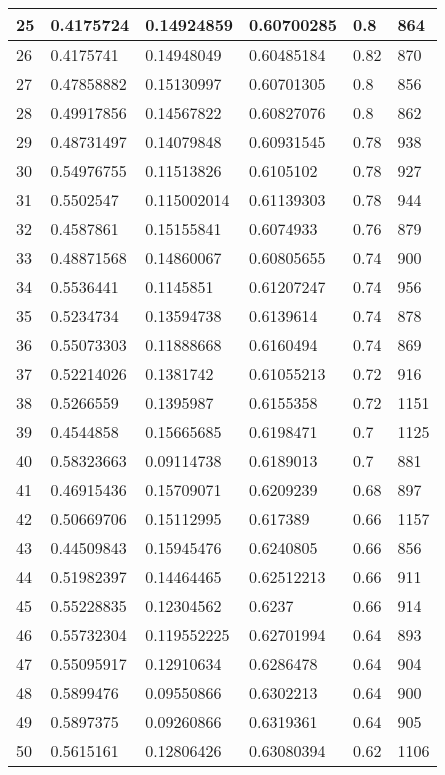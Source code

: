 \begin{longtable}{|l|l|l|l|l|l|}
25 & 0.4175724 & 0.14924859 & 0.60700285 & 0.8 & 864 \\ \hline 
26 & 0.4175741 & 0.14948049 & 0.60485184 & 0.82 & 870 \\ \hline 
27 & 0.47858882 & 0.15130997 & 0.60701305 & 0.8 & 856 \\ \hline 
28 & 0.49917856 & 0.14567822 & 0.60827076 & 0.8 & 862 \\ \hline 
29 & 0.48731497 & 0.14079848 & 0.60931545 & 0.78 & 938 \\ \hline 
30 & 0.54976755 & 0.11513826 & 0.6105102 & 0.78 & 927 \\ \hline 
31 & 0.5502547 & 0.115002014 & 0.61139303 & 0.78 & 944 \\ \hline 
32 & 0.4587861 & 0.15155841 & 0.6074933 & 0.76 & 879 \\ \hline 
33 & 0.48871568 & 0.14860067 & 0.60805655 & 0.74 & 900 \\ \hline 
34 & 0.5536441 & 0.1145851 & 0.61207247 & 0.74 & 956 \\ \hline 
35 & 0.5234734 & 0.13594738 & 0.6139614 & 0.74 & 878 \\ \hline 
36 & 0.55073303 & 0.11888668 & 0.6160494 & 0.74 & 869 \\ \hline 
37 & 0.52214026 & 0.1381742 & 0.61055213 & 0.72 & 916 \\ \hline 
38 & 0.5266559 & 0.1395987 & 0.6155358 & 0.72 & 1151 \\ \hline 
39 & 0.4544858 & 0.15665685 & 0.6198471 & 0.7 & 1125 \\ \hline 
40 & 0.58323663 & 0.09114738 & 0.6189013 & 0.7 & 881 \\ \hline 
41 & 0.46915436 & 0.15709071 & 0.6209239 & 0.68 & 897 \\ \hline 
42 & 0.50669706 & 0.15112995 & 0.617389 & 0.66 & 1157 \\ \hline 
43 & 0.44509843 & 0.15945476 & 0.6240805 & 0.66 & 856 \\ \hline 
44 & 0.51982397 & 0.14464465 & 0.62512213 & 0.66 & 911 \\ \hline 
45 & 0.55228835 & 0.12304562 & 0.6237 & 0.66 & 914 \\ \hline 
46 & 0.55732304 & 0.119552225 & 0.62701994 & 0.64 & 893 \\ \hline 
47 & 0.55095917 & 0.12910634 & 0.6286478 & 0.64 & 904 \\ \hline 
48 & 0.5899476 & 0.09550866 & 0.6302213 & 0.64 & 900 \\ \hline 
49 & 0.5897375 & 0.09260866 & 0.6319361 & 0.64 & 905 \\ \hline 
50 & 0.5615161 & 0.12806426 & 0.63080394 & 0.62 & 1106 \\ \hline 
\end{longtable}